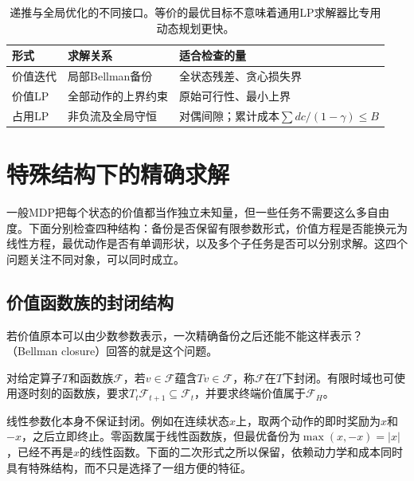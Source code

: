 \begin{table}[htbp]
 \centering
 \small
 \begin{tabularx}{\linewidth}{@{}l>{\raggedright\arraybackslash}X>{\raggedright\arraybackslash}X@{}}
  \toprule
  形式 & 求解关系 & 适合检查的量\\
  \midrule
  价值迭代 & 局部Bellman备份 & 全状态残差、贪心损失界\\
  价值LP & 全部动作的上界约束 & 原始可行性、最小上界\\
  占用LP & 非负流及全局守恒 & 对偶间隙；累计成本$\sum dc/(1-\gamma)\leq B$\\
  \bottomrule
 \end{tabularx}
 \caption{递推与全局优化的不同接口。等价的最优目标不意味着通用LP求解器比专用动态规划更快。}
 \label{tab:rl-planning-dp-lp}
\end{table}

\section{特殊结构下的精确求解}
\label{sec:rl-planning-structure}

一般MDP把每个状态的价值都当作独立未知量，但一些任务不需要这么多自由度。下面分别检查四种结构：备份是否保留有限参数形式，价值方程是否能换元为线性方程，最优动作是否有单调形状，以及多个子任务是否可以分别求解。这四个问题关注不同对象，可以同时成立。

\subsection{价值函数族的封闭结构}
\label{sec:rl-planning-closure}

若价值原本可以由少数参数表示，一次精确备份之后还能不能这样表示？（Bellman closure）回答的就是这个问题。

\begin{definition}[函数族的Bellman封闭性]
 \label{def:rl-planning-closure}
 对给定算子$T$和函数族$\mathcal F$，若$v\in\mathcal F$蕴含$Tv\in\mathcal F$，称$\mathcal F$在$T$下封闭。有限时域也可使用逐时刻的函数族，要求$T_t\mathcal F_{t+1}\subseteq\mathcal F_t$，并要求终端价值属于$\mathcal F_H$。
\end{definition}

线性参数化本身不保证封闭。例如在连续状态$x$上，取两个动作的即时奖励为$x$和$-x$，之后立即终止。零函数属于线性函数族，但最优备份为$\max(x,-x)=|x|$，已经不再是$x$的线性函数。下面的二次形式之所以保留，依赖动力学和成本同时具有特殊结构，而不只是选择了一组方便的特征。

